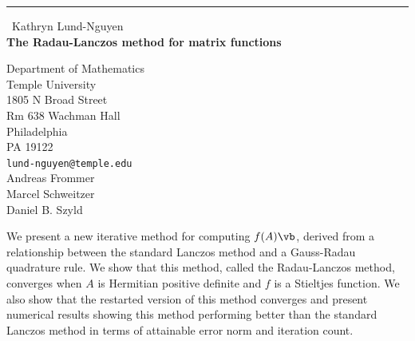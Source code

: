 \documentclass{report}
\begin{document}
\begin{center}
\rule{6in}{1pt} \
{\large Kathryn Lund-Nguyen \\
{\bf The Radau-Lanczos method for matrix functions}}

Department of Mathematics \\ Temple University \\ 1805 N Broad Street \\ Rm 638 Wachman Hall \\ Philadelphia \\ PA 19122
\\
{\tt lund-nguyen@temple.edu}\\
Andreas Frommer\\
Marcel Schweitzer\\
Daniel B. Szyld\end{center}

We present a new iterative method for computing $f(A) \vb$, derived from
a relationship between the standard Lanczos method and a Gauss-Radau
quadrature rule. We show that this method, called the Radau-Lanczos
method, converges when $A$ is Hermitian positive definite and $f$ is a
Stieltjes function. We also show that the restarted version of this
method converges and present numerical results showing this method
performing better than the standard Lanczos method in terms of attainable
error norm and iteration count.
\end{document}
